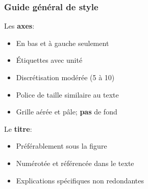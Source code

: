 \documentclass[aspectratio=169]{beamer}
\begin{document}
\begin{frame}[c]\frametitle{Guide général de style}

Les \textbf{axes}:
\vspace{-\parskip}
\begin{itemize}
	\item En bas et à gauche seulement
	\item Étiquettes avec unité
	\item Discrétisation modérée (5 à 10)
	\item Police de taille similaire au texte
	\item Grille aérée et pâle; \textbf{pas} de fond
\end{itemize}

Le \textbf{titre}:
\vspace{-\parskip}
\begin{itemize}
	\item Préférablement sous la figure
	\item Numérotée et référencée dans le texte
	\item Explications spécifiques non redondantes
\end{itemize}

\end{frame}
\end{document}

